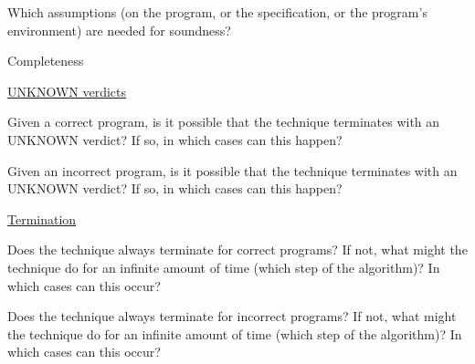\documentclass[a4paper]{article}
\begin{document}
\begin{landscape}
\begin{minipage}[t]{0.2\linewidth}
\begin{betterlist}
\begin{betterlist}
\begin{betterlist}
			\end{betterlist}
			\item Which assumptions (on the program, or the specification, or the program’s environment) are needed for soundness?
		\end{betterlist}
		\item \alert{Completeness}
		\begin{betterlist}
			\item \underline{UNKNOWN verdicts}
			\begin{betterlist}
				\item Given a correct program, is it possible that the technique terminates with an UNKNOWN verdict? If so, in which cases can this happen?

				\item Given an incorrect program, is it possible that the technique terminates with an UNKNOWN verdict? If so, in which cases can this happen?

			\end{betterlist}
			\item \underline{Termination}
			\begin{betterlist}
				\item Does the technique always terminate for correct programs? If not, what might the technique do for an infinite amount of time (which step of the algorithm)? In which cases can this occur?

				\framebox[0.95\textwidth][l]{\parbox{0.91\textwidth}{
  \begin{betterlist}
      \item TODO
  \end{betterlist}
					}}
				\item Does the technique always terminate for incorrect programs? If not, what might the technique do for an infinite amount of time (which step of the algorithm)? In which cases can this occur?


\end{betterlist}
\end{betterlist}
\end{betterlist}
\end{minipage}
\end{landscape}
\end{document}
